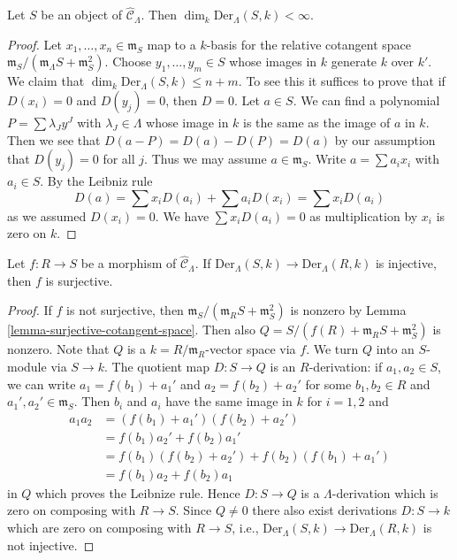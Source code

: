\begin{lemma}
\label{lemma-derivations-finite}
Let $S$ be an object of $\widehat{\mathcal{C}}_\Lambda$.
Then $\dim_k \text{Der}_\Lambda(S, k) < \infty$.
\end{lemma}

\begin{proof}
Let $x_1, \ldots, x_n \in \mathfrak m_S$ map to a $k$-basis
for the relative cotangent space
$\mathfrak m_S/(\mathfrak m_\Lambda S + \mathfrak m_S^2)$.
Choose $y_1, \ldots, y_m \in S$ whose images in $k$ generate $k$
over $k'$. We claim that $\dim_k \text{Der}_\Lambda(S, k) \leq n + m$.
To see this it suffices to prove that if $D(x_i) = 0$ and
$D(y_j) = 0$, then $D = 0$. Let $a \in S$. We can find a
polynomial $P = \sum \lambda_J y^J$ with $\lambda_J \in \Lambda$
whose image in $k$ is the same as the image of $a$ in $k$.
Then we see that $D(a - P) = D(a) - D(P) = D(a)$ by our assumption
that $D(y_j) = 0$ for all $j$. Thus we may assume $a \in \mathfrak m_S$.
Write $a = \sum a_i x_i$ with $a_i \in S$. By the Leibniz rule
$$
D(a) = \sum x_iD(a_i) + \sum a_iD(x_i) = \sum x_iD(a_i)
$$
as we assumed $D(x_i) = 0$. We have $\sum x_iD(a_i) = 0$
as multiplication by $x_i$ is zero on $k$.
\end{proof}

\begin{lemma}
\label{lemma-derivations-surjective}
Let $f : R \to S$ be a morphism of $\widehat{\mathcal{C}}_\Lambda$.
If $\text{Der}_\Lambda(S, k) \to \text{Der}_\Lambda(R, k)$ is injective,
then $f$ is surjective.
\end{lemma}

\begin{proof}
If $f$ is not surjective, then
$\mathfrak m_S/(\mathfrak m_R S + \mathfrak m_S^2)$ is nonzero by
Lemma \ref{lemma-surjective-cotangent-space}.
Then also $Q = S/(f(R) + \mathfrak m_R S + \mathfrak m_S^2)$ is nonzero.
Note that $Q$ is a $k = R/\mathfrak m_R$-vector space via $f$. We turn
$Q$ into an $S$-module via $S \to k$. The quotient
map $D : S \to Q$ is an $R$-derivation: if $a_1, a_2 \in S$, we can write
$a_1 = f(b_1) + a_1'$ and $a_2 = f(b_2) + a_2'$ for some
$b_1, b_2 \in R$ and $a_1', a_2' \in \mathfrak m_S$. Then
$b_i$ and $a_i$ have the same image in $k$ for $i = 1, 2$ and
\begin{align*}
a_1a_2 & = (f(b_1) + a_1')(f(b_2) + a_2') \\
& = f(b_1)a_2' + f(b_2)a_1' \\
& = f(b_1)(f(b_2) + a_2') + f(b_2)(f(b_1) + a_1') \\
& = f(b_1)a_2 + f(b_2)a_1
\end{align*}
in $Q$ which proves the Leibnize rule. Hence $D : S \to Q$ is a
$\Lambda$-derivation which is zero on composing with $R \to S$.
Since $Q \not = 0$ there also exist derivations $D : S \to k$ which
are zero on composing with $R \to S$, i.e.,
$\text{Der}_\Lambda(S, k) \to \text{Der}_\Lambda(R, k)$ is not injective.
\end{proof}

